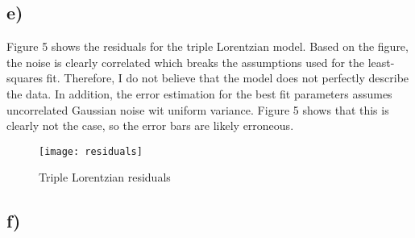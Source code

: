 \documentclass{article}
\newcommand{\<}[1]{\left\langle #1 \right\rangle }
\begin{document}
\subsection{e)}
Figure 5 shows the residuals for the triple Lorentzian model. Based on the figure, the noise is clearly correlated which breaks the assumptions used for the least-squares fit. Therefore, I do not believe that the model does not perfectly describe the data. In addition, the error estimation for the best fit parameters assumes uncorrelated Gaussian noise wit uniform variance. Figure 5 shows that this is clearly not the case, so the error bars are likely erroneous.
\begin{figure}[h]
	\caption{Triple Lorentzian residuals}
	\centering{}
	\texttt{[image: residuals]}
\end{figure}

\subsection{f)}
\end{document}
